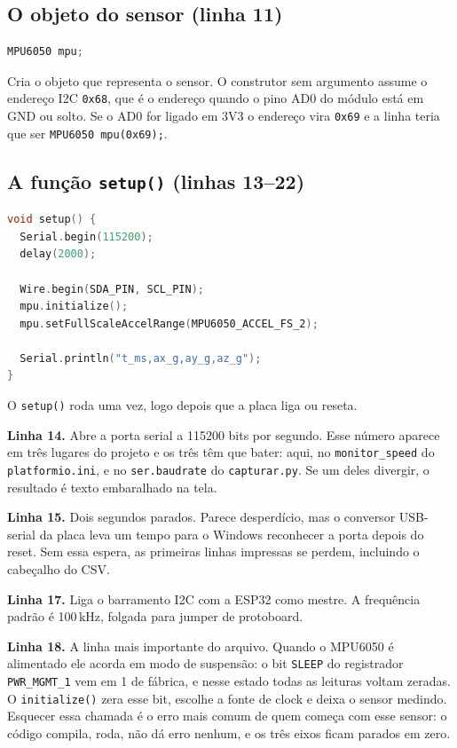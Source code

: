\documentclass[11pt,a4paper]{article}
\begin{document}
\subsection{O objeto do sensor (linha 11)}

\begin{lstlisting}[language=C++,firstnumber=11]
MPU6050 mpu;
\end{lstlisting}

Cria o objeto que representa o sensor. O construtor sem argumento assume o
endereço I2C \texttt{0x68}, que é o endereço quando o pino AD0 do módulo está
em GND ou solto. Se o AD0 for ligado em 3V3 o endereço vira \texttt{0x69} e a
linha teria que ser \texttt{MPU6050 mpu(0x69);}.

\subsection{A função \texttt{setup()} (linhas 13--22)}

\begin{lstlisting}[language=C++,firstnumber=13]
void setup() {
  Serial.begin(115200);
  delay(2000);

  Wire.begin(SDA_PIN, SCL_PIN);
  mpu.initialize();
  mpu.setFullScaleAccelRange(MPU6050_ACCEL_FS_2);

  Serial.println("t_ms,ax_g,ay_g,az_g");
}
\end{lstlisting}

O \texttt{setup()} roda uma vez, logo depois que a placa liga ou reseta.

\textbf{Linha 14.} Abre a porta serial a 115200 bits por segundo. Esse número
aparece em três lugares do projeto e os três têm que bater: aqui, no
\texttt{monitor\_speed} do \texttt{platformio.ini}, e no \texttt{ser.baudrate}
do \texttt{capturar.py}. Se um deles divergir, o resultado é texto embaralhado
na tela.

\textbf{Linha 15.} Dois segundos parados. Parece desperdício, mas o conversor
USB-serial da placa leva um tempo para o Windows reconhecer a porta depois do
reset. Sem essa espera, as primeiras linhas impressas se perdem, incluindo o
cabeçalho do CSV.

\textbf{Linha 17.} Liga o barramento I2C com a ESP32 como mestre. A frequência
padrão é 100\,kHz, folgada para jumper de protoboard.

\textbf{Linha 18.} A linha mais importante do arquivo. Quando o MPU6050 é
alimentado ele acorda em modo de suspensão: o bit \texttt{SLEEP} do
registrador \texttt{PWR\_MGMT\_1} vem em 1 de fábrica, e nesse estado todas as
leituras voltam zeradas. O \texttt{initialize()} zera esse bit, escolhe a
fonte de clock e deixa o sensor medindo. Esquecer essa chamada é o erro mais
comum de quem começa com esse sensor: o código compila, roda, não dá erro
nenhum, e os três eixos ficam parados em zero.
\end{document}
